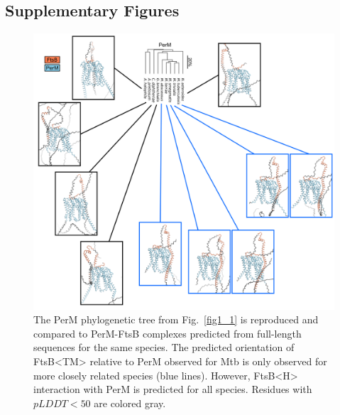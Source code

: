 \documentclass[twocolumn,pdflatex,sn-nature]{sn-jnl}%
\def\textsuperscript#1{<#1>}%
\newcommand\mtb{Mtb}
\newcommand\ftsbTM{FtsB\textsuperscript{TM}}
\newcommand\ftsbH{FtsB\textsuperscript{H}}
\begin{document}
\onecolumn
\begin{appendices}

\section{Supplementary Figures}

\begin{figure}[htb]
\centering
\includegraphics[width=1.0\textwidth]{../figures/figS1.png}
\caption{The PerM phylogenetic tree from Fig.~\ref{fig1_1} is reproduced and compared to PerM-FtsB complexes predicted from full-length sequences for the same species. The predicted orientation of \ftsbTM{} relative to PerM observed for \mtb{} is only observed for more closely related species (blue lines). However, \ftsbH{} interaction with PerM is predicted for all species. Residues with $pLDDT<50$ are colored gray.}\label{figS1}
\end{figure}

\end{appendices}
\end{document}
